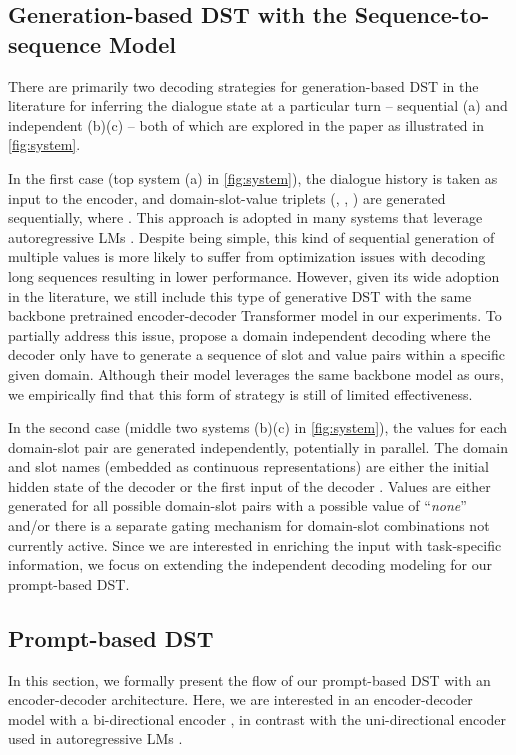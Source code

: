 \documentclass[11pt]{article}
\begin{document}
\subsection{Generation-based DST with the Sequence-to-sequence Model}
There are primarily two decoding strategies for generation-based DST in the literature for inferring the dialogue state at a particular turn -- sequential (a) and independent (b)(c) -- both of which are explored in the paper as illustrated in \autoref{fig:system}. 

In the first case (top system (a) in \autoref{fig:system}), the dialogue history  is taken as input to the encoder, and domain-slot-value triplets (, , ) are generated sequentially, where . This approach is adopted in many systems that leverage autoregressive LMs \cite{peng2020soloist,hosseini2020simple}. 
Despite being simple, this kind of sequential generation of multiple values is more likely to suffer from optimization issues with decoding long sequences resulting in lower performance. However, given its wide adoption in the literature, we still include this type of generative DST with the same backbone pretrained encoder-decoder Transformer model in our experiments.
To partially address this issue, \citet{lin2020mintl} propose a domain independent decoding where the decoder only have to generate a sequence of slot and value pairs within a specific given domain. Although their model leverages the same backbone model as ours, we empirically find that this form of strategy is still of limited effectiveness.

In the second case (middle two systems (b)(c) in \autoref{fig:system}), the values for each domain-slot pair are generated independently, potentially in parallel.  
The domain and slot names (embedded as continuous representations) are either the initial hidden state of the decoder \cite{kim2020efficient} or the first input of the decoder \cite{wu2019transferable}.
Values are either generated for all possible domain-slot  pairs with a possible value of ``\textit{none}'' and/or there is a separate gating mechanism for domain-slot combinations not currently active.
Since we are interested in enriching the input with task-specific information, we focus on extending the independent decoding modeling for our prompt-based DST.

\subsection{Prompt-based DST}
In this section, we formally present the flow of our prompt-based DST with an encoder-decoder architecture.
Here, we are interested in an encoder-decoder model with a bi-directional encoder \cite{raffel2020exploring,lewis-etal-2020-bart}, in contrast with the uni-directional encoder used in autoregressive LMs \cite{radford2019language,gpt3}.
\end{document}
